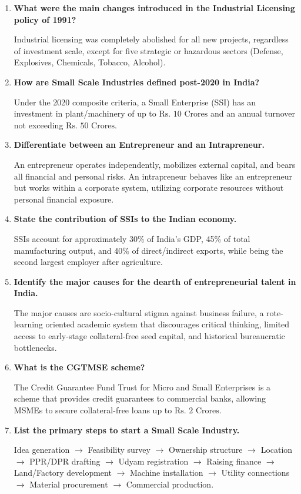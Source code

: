 \documentclass[12pt,a4paper]{article}
\newcommand{\Q}[1]{\textbf{#1}\par\noindent\ignorespaces}
\begin{document}
\begin{tcolorbox}[exambox, title={\textbf{Frequently Asked / Viva Questions}}]
\begin{enumerate}[topsep=0pt, label=\textbf{Q\arabic*.}, itemsep=5pt]
  \item \Q{What were the main changes introduced in the Industrial Licensing policy of 1991?}
    Industrial licensing was completely abolished for all new projects, regardless of investment scale, except for five strategic or hazardous sectors (Defense, Explosives, Chemicals, Tobacco, Alcohol).
  \item \Q{How are Small Scale Industries defined post-2020 in India?}
    Under the 2020 composite criteria, a Small Enterprise (SSI) has an investment in plant/machinery of up to $\text{Rs. } 10\text{ Crores}$ and an annual turnover not exceeding $\text{Rs. } 50\text{ Crores}$.
  \item \Q{Differentiate between an Entrepreneur and an Intrapreneur.}
    An entrepreneur operates independently, mobilizes external capital, and bears all financial and personal risks. An intrapreneur behaves like an entrepreneur but works within a corporate system, utilizing corporate resources without personal financial exposure.
  \item \Q{State the contribution of SSIs to the Indian economy.}
    SSIs account for approximately 30\% of India's GDP, 45\% of total manufacturing output, and 40\% of direct/indirect exports, while being the second largest employer after agriculture.
  \item \Q{Identify the major causes for the dearth of entrepreneurial talent in India.}
    The major causes are socio-cultural stigma against business failure, a rote-learning oriented academic system that discourages critical thinking, limited access to early-stage collateral-free seed capital, and historical bureaucratic bottlenecks.
  \item \Q{What is the CGTMSE scheme?}
    The Credit Guarantee Fund Trust for Micro and Small Enterprises is a scheme that provides credit guarantees to commercial banks, allowing MSMEs to secure collateral-free loans up to $\text{Rs. } 2\text{ Crores}$.
  \item \Q{List the primary steps to start a Small Scale Industry.}
    Idea generation $\rightarrow$ Feasibility survey $\rightarrow$ Ownership structure $\rightarrow$ Location $\rightarrow$ PPR/DPR drafting $\rightarrow$ Udyam registration $\rightarrow$ Raising finance $\rightarrow$ Land/Factory development $\rightarrow$ Machine installation $\rightarrow$ Utility connections $\rightarrow$ Material procurement $\rightarrow$ Commercial production.

\end{enumerate}
\end{tcolorbox}
\end{document}
